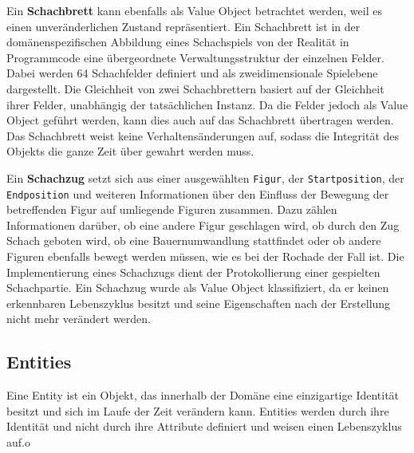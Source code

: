 Ein \textbf{Schachbrett} kann ebenfalls als Value Object betrachtet werden, weil es einen unveränderlichen Zustand repräsentiert. 
Ein Schachbrett ist in der domänenspezifischen Abbildung eines Schachspiels von der Realität in Programmcode eine übergeordnete Verwaltungsstruktur der einzelnen Felder.
Dabei werden 64 Schachfelder definiert und als zweidimensionale Spielebene dargestellt.
Die Gleichheit von zwei Schachbrettern basiert auf der Gleichheit ihrer Felder, unabhängig der tatsächlichen Instanz. 
Da die Felder jedoch als Value Object geführt werden, kann dies auch auf das Schachbrett übertragen werden. 
Das Schachbrett weist keine Verhaltensänderungen auf, sodass die Integrität des Objekts die ganze Zeit über gewahrt werden muss. 

Ein \textbf{Schachzug} setzt sich aus einer ausgewählten \texttt{Figur}, der \texttt{Startposition}, der \texttt{Endposition} und weiteren Informationen über den Einfluss der Bewegung der betreffenden Figur auf umliegende Figuren zusammen. 
Dazu zählen Informationen darüber, ob eine andere Figur geschlagen wird, ob durch den Zug Schach geboten wird, ob eine Bauernumwandlung stattfindet oder ob andere Figuren ebenfalls bewegt werden müssen, wie es bei der Rochade der Fall ist. 
Die Implementierung eines Schachzugs dient der Protokollierung einer gespielten Schachpartie. 
Ein Schachzug wurde als Value Object klassifiziert, da er keinen erkennbaren Lebenszyklus besitzt und seine Eigenschaften nach der Erstellung nicht mehr verändert werden. 

\subsection*{Entities}

Eine Entity ist ein Objekt, das innerhalb der Domäne eine einzigartige Identität besitzt und sich im Laufe der Zeit verändern kann. 
Entities werden durch ihre Identität und nicht durch ihre Attribute definiert und weisen einen Lebenszyklus auf.o

